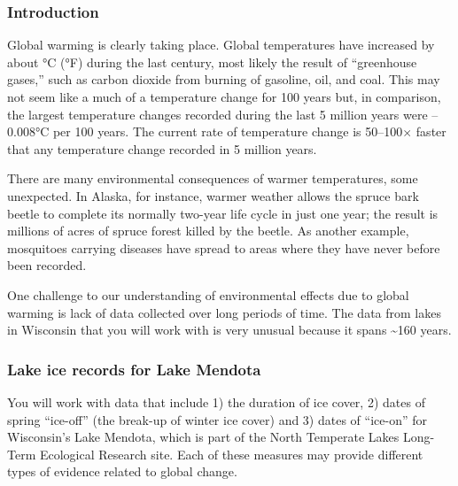 \documentclass[12pt, hidelinks, addpoints]{exam}
\begin{document}
\subsubsection*{Introduction}

Global warming is clearly taking place. Global temperatures
have increased by about {}°C ({}°F) during the last century,
most likely the result of ``greenhouse gases,'' such as carbon dioxide
from burning of gasoline, oil, and coal. This may not seem like a
much of a temperature change for 100 years but, in comparison, 
the largest temperature changes recorded during the last 5 million years were 
{–0.008}°C per 100 years. The current rate of temperature change is 
50–100$\times$ faster that any temperature change recorded in 5 million years.

There are many environmental consequences of warmer temperatures, some
unexpected. In Alaska, for instance, warmer weather allows the spruce
bark beetle to complete its normally two-year life cycle in just one
year; the result is millions of acres of spruce forest killed by the
beetle. As another example, mosquitoes carrying diseases have spread to
areas where they have never before been recorded.

One challenge to our understanding of environmental effects due to
global warming is lack of data collected over long periods of time. The
data from lakes in Wisconsin that you will work with is very unusual
because it spans \textasciitilde{}160 years.

\subsubsection*{Lake ice records for Lake Mendota}

You will work with data that include 1) the duration of ice cover, 2) dates
of spring ``ice-off'' (the break-up of winter ice cover) and 3) dates of
``ice-on'' for Wisconsin's Lake Mendota, which is part of the North
Temperate Lakes Long-Term Ecological Research site. Each of these
measures may provide different types of evidence related to global
change.
\end{document}
